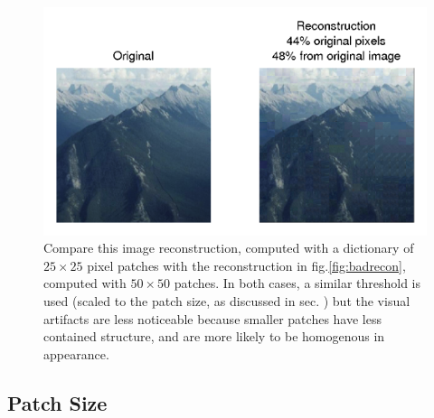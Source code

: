  \begin{figure}
\centering
\includegraphics[width=1\linewidth]{Figures/184_25.png}
\caption{Compare this image reconstruction, computed with a dictionary of $25\times 25$ pixel patches with the reconstruction in fig.\ref{fig:badrecon}, computed with $50\times 50$ patches. In both cases, a similar threshold is used (scaled to the patch size, as discussed in sec. \label{sec:simthresh}) but the visual artifacts are less noticeable because smaller patches have less contained structure, and are more likely to be homogenous in appearance.}
\label{fig:patchsize}
\end{figure}




\subsection{Patch Size}
\label{sec:patchsize}


